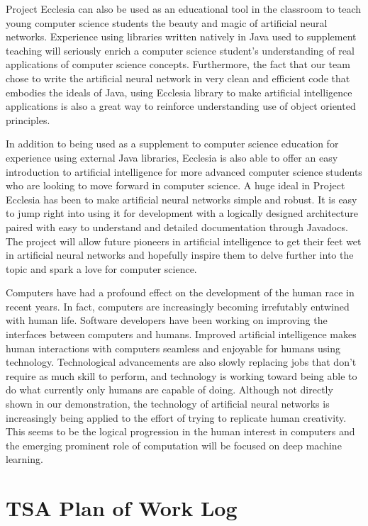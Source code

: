 \documentclass[letterpaper, 10pt]{article}
\begin{document}
	Project Ecclesia can also be used as an educational tool in the classroom to teach young computer science students the beauty and magic of artificial neural networks. Experience using libraries written natively in Java used to supplement teaching will seriously enrich a computer science student's understanding of real applications of computer science concepts. Furthermore, the fact that our team chose to write the artificial neural network in very clean and efficient code that embodies the ideals of Java, using Ecclesia library to make artificial intelligence applications is also a great way to reinforce understanding use of object oriented principles.
	
	In addition to being used as a supplement to computer science education for experience using external Java libraries, Ecclesia is also able to offer an easy introduction to artificial intelligence for more advanced computer science students who are looking to move forward in computer science. A huge ideal in Project Ecclesia has been to make artificial neural networks simple and robust. It is easy to jump right into using it for development with a logically designed architecture paired with easy to understand and detailed documentation through Javadocs. The project will allow future pioneers in artificial intelligence to get their feet wet in artificial neural networks and hopefully inspire them to delve further into the topic and spark a love for computer science.
	
	Computers have had a profound effect on the development of the human race in recent years. In fact, computers are increasingly becoming irrefutably entwined with human life. Software developers have been working on improving the interfaces between computers and humans. Improved artificial intelligence makes human interactions with computers seamless and enjoyable for humans using technology. Technological advancements are also slowly replacing jobs that don't require as much skill to perform, and technology is working toward being able to do what currently only humans are capable of doing. Although not directly shown in our demonstration, the technology of artificial neural networks is increasingly being applied to the effort of trying to replicate human creativity. This seems to be the logical progression in the human interest in computers and the emerging prominent role of computation will be focused on deep machine learning.
	
\cleardoublepage
\section{TSA Plan of Work Log}
	
\end{document}
